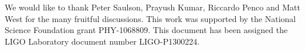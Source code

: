 \documentclass[%
 reprint,
 amsmath,amssymb,
 aps,
]{revtex4-1}
\begin{document}
\begin{acknowledgments}
We would like to thank Peter Saulson, Prayush Kumar, Riccardo Penco and Matt West for the many fruitful discussions. This work was supported by the National Science Foundation grant PHY-1068809. This document has been assigned the LIGO Laboratory document number  LIGO-P1300224.
\end{acknowledgments}

\appendix



\nocite{*}


\end{document}
